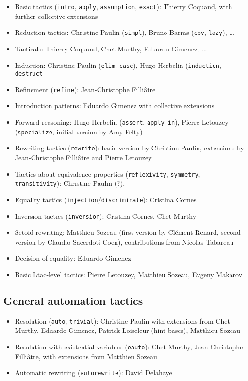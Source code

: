 \documentclass{article}
\begin{document}
\begin{itemize}
\item Basic tactics (\texttt{intro}, \texttt{apply},
  \texttt{assumption}, \texttt{exact}): Thierry Coquand, with further
  collective extensions
\item Reduction tactics: Christine Paulin (\texttt{simpl}), Bruno
  Barras (\texttt{cbv}, \texttt{lazy}), ...
\item Tacticals: Thierry Coquand, Chet Murthy, Eduardo Gimenez, ...
\item Induction: Christine Paulin (\texttt{elim}, \texttt{case}), Hugo Herbelin (\texttt{induction}, \texttt{destruct}
\item Refinement (\texttt{refine}): Jean-Christophe Filliâtre
\item Introduction patterns: Eduardo Gimenez with collective extensions
\item Forward reasoning: Hugo Herbelin (\texttt{assert}, \texttt{apply in}), Pierre Letouzey (\texttt{specialize}, initial version by Amy Felty)
\item Rewriting tactics (\texttt{rewrite}): basic version by Christine Paulin,
  extensions by Jean-Christophe Filliâtre and Pierre Letouzey
\item Tactics about equivalence properties (\texttt{reflexivity},
  \texttt{symmetry}, \texttt{transitivity}): Christine Paulin (?),
\item Equality tactics (\texttt{injection}/\texttt{discriminate}):
  Cristina Cornes
\item Inversion tactics (\texttt{inversion}): Cristina Cornes, Chet Murthy
\item Setoid rewriting: Matthieu Sozeau (first version by Clément
  Renard, second version by Claudio Sacerdoti Coen), contributions
  from Nicolas Tabareau
\item Decision of equality: Eduardo Gimenez
\item Basic Ltac-level tactics: Pierre Letouzey, Matthieu Sozeau,
  Evgeny Makarov
\end{itemize}

\subsection{General automation tactics}

\begin{itemize}
\item Resolution (\texttt{auto}, \texttt{trivial}): Christine Paulin
  with extensions from Chet Murthy, Eduardo Gimenez, Patrick
  Loiseleur (hint bases), Matthieu Sozeau
\item Resolution with existential variables (\texttt{eauto}): Chet Murthy, Jean-Christophe Filliâtre, with extensions from Matthieu Sozeau
\item Automatic rewriting (\texttt{autorewrite}): David Delahaye
\end{itemize}
\end{document}
